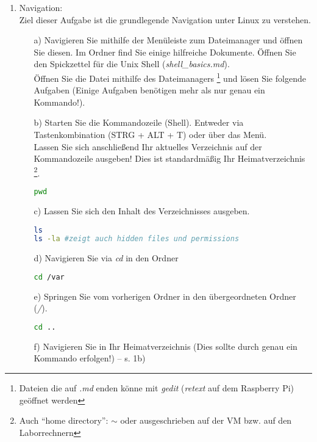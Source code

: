 \documentclass[paper=a4,fontsize=11pt]{scrartcl}%
\numberwithin{equation}{section}
\begin{document}
\begin{enumerate}
\item Navigation:\\
Ziel dieser Aufgabe ist die grundlegende Navigation unter Linux zu verstehen.
	\begin{itemize}
		\item[a)] Navigieren Sie mithilfe der Menüleiste zum Dateimanager und öffnen Sie diesen. Im Ordner  find Sie einige hilfreiche Dokumente. Öffnen Sie den Spickzettel für die Unix Shell (\emph{shell\_basics.md}).\\
Öffnen Sie die Datei mithilfe des Dateimanagers \footnote{Dateien die auf \emph{.md} enden könne mit \emph{gedit} (\emph{retext} auf dem Raspberry Pi) geöffnet werden} und lösen Sie folgende Aufgaben (Einige Aufgaben benötigen mehr als nur genau ein Kommando!).
		\item[b)] Starten Sie die Kommandozeile (Shell). Entweder via Tastenkombination  (STRG + ALT + T) oder über das Menü.\\
		Lassen Sie sich anschließend Ihr aktuelles Verzeichnis auf der Kommandozeile ausgeben! Dies ist standardmäßig Ihr Heimatverzeichnis \footnote{Auch \enquote{home directory}: $\sim$ oder ausgeschrieben  auf der VM bzw.  auf den Laborrechnern}.\\
\begin{lstlisting}[style=Bash, language=Bash]
pwd
		\end{lstlisting}
		\item[c)] Lassen Sie sich den Inhalt des Verzeichnisses ausgeben.\\
\begin{lstlisting}[style=Bash, language=Bash]
ls
ls -la #zeigt auch hidden files und permissions
		\end{lstlisting}
		\item[d)] Navigieren Sie via \emph{cd} in den Ordner \\
\begin{lstlisting}[style=Bash, language=Bash]
cd /var
		\end{lstlisting}
		\item[e)] Springen Sie vom vorherigen Ordner in den übergeordneten Ordner (\emph{/}).\\
\begin{lstlisting}[style=Bash, language=Bash]
cd .. 
	\end{lstlisting}
		\item[f)] Navigieren Sie in Ihr Heimatverzeichnis (Dies sollte durch genau ein Kommando erfolgen!) -- s. 1b)\\

\end{itemize}
\end{enumerate}
\end{document}
